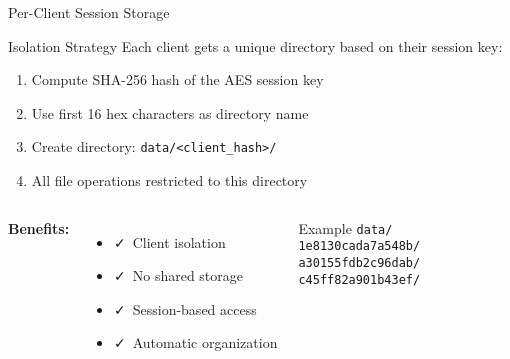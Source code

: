 \documentclass[aspectratio=169]{beamer}
\begin{document}
\begin{frame}{Per-Client Session Storage}
\begin{block}{Isolation Strategy}
Each client gets a unique directory based on their session key:
\begin{enumerate}
    \item Compute SHA-256 hash of the AES session key
    \item Use first 16 hex characters as directory name
    \item Create directory: \texttt{data/<client\_hash>/}
    \item All file operations restricted to this directory
\end{enumerate}
\end{block}

\vspace{0.3cm}

\begin{columns}
\textbf{Benefits:}
\begin{itemize}
    \item \faCheck~Client isolation
    \item \faCheck~No shared storage
    \item \faCheck~Session-based access
    \item \faCheck~Automatic organization
\end{itemize}

\begin{exampleblock}{Example}
\texttt{data/}\\
\quad\texttt{1e8130cada7a548b/}\\
\quad\texttt{a30155fdb2c96dab/}\\
\quad\texttt{c45ff82a901b43ef/}
\end{exampleblock}
\end{columns}
\end{frame}
\end{document}
